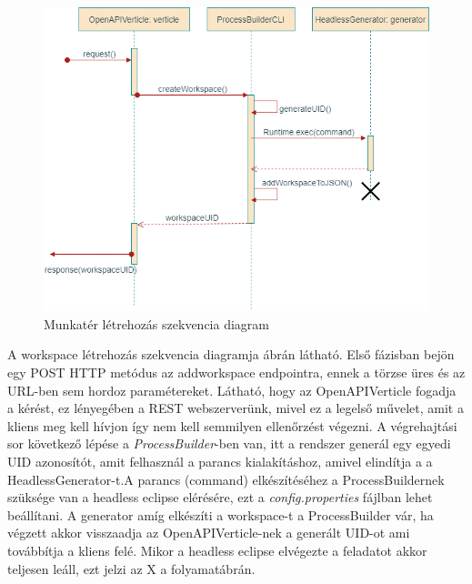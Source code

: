 \begin{figure}[!ht]
	\includegraphics[width=150mm, keepaspectratio]{figures/add_workspace_seq.png}
	\caption{Munkatér létrehozás szekvencia diagram}
	\label{fig:addworkspace}
\end{figure}

A workspace létrehozás szekvencia diagramja  ábrán látható. Első fázisban bejön egy POST HTTP metódus az addworkspace endpointra, ennek a törzse üres és az URL-ben sem hordoz paramétereket. Látható, hogy az OpenAPIVerticle fogadja a kérést, ez lényegében a REST webszerverünk, mivel ez a legelső művelet, amit a kliens meg kell hívjon így nem kell semmilyen ellenőrzést végezni. A végrehajtási sor következő lépése a \textit{ProcessBuilder}-ben van, itt a rendszer generál egy egyedi UID azonosítót, amit felhasznál a parancs kialakításhoz, amivel elindítja a a HeadlessGenerator-t.A parancs (command) elkészítéséhez a ProcessBuildernek szüksége van a headless eclipse elérésére, ezt a \textit{config.properties} fájlban lehet beállítani. A generator amíg elkészíti a workspace-t a ProcessBuilder vár, ha végzett akkor visszaadja az OpenAPIVerticle-nek a generált UID-ot ami továbbítja a kliens felé. Mikor a headless eclipse elvégezte a feladatot akkor teljesen leáll, ezt jelzi az X a folyamatábrán.


